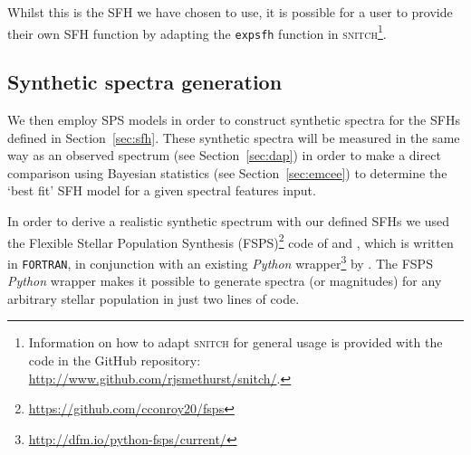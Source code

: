 \documentclass[useAMS,usenatbib]{mn2e}
\begin{document}

Whilst this is the SFH we have chosen to use, it is possible for a user to provide their own SFH function by adapting the \texttt{expsfh} function in \textsc{snitch}\footnote{\label{adapt}Information on how to adapt \textsc{snitch} for general usage is provided with the code in the GitHub repository: \url{http://www.github.com/rjsmethurst/snitch/}.}.


\subsection{Synthetic spectra generation}\label{sec:fsps}

We then employ SPS models in order to construct synthetic spectra for the SFHs defined in Section~\ref{sec:sfh}. These synthetic spectra will be measured in the same way as an observed spectrum (see Section~\ref{sec:dap}) in order to make a direct comparison using Bayesian statistics (see Section~\ref{sec:emcee}) to determine the `best fit' SFH model for a given spectral features input. 

In order to derive a realistic synthetic spectrum with our defined SFHs we used the Flexible Stellar Population Synthesis (FSPS)\footnote{\url{https://github.com/cconroy20/fsps}} code of \cite{conroy09} and \citet{conroy10}, which is written in \texttt{FORTRAN}, in conjunction with an existing \emph{Python} wrapper\footnote{\url{http://dfm.io/python-fsps/current/}} by \cite{python_fsps}. The FSPS \emph{Python} wrapper makes it possible to generate spectra (or magnitudes) for any arbitrary stellar population in just two lines of code.  
\end{document}
